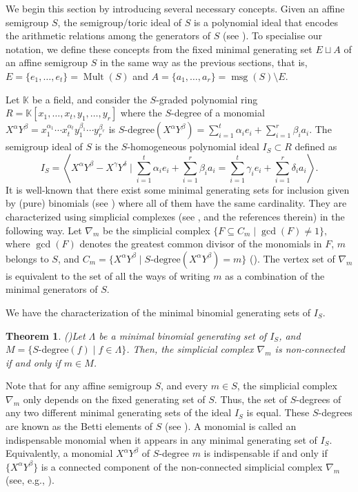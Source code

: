 \documentclass[a4paper,11pt]{article}
\newtheorem{theorem}{Theorem}
\def\k{\mathbb{K}}
\def\msg{\operatorname{msg}}
\def\Mult{\operatorname{Mult}}
\begin{document}
{We begin this section by introducing several necessary concepts. Given an affine semigroup $S$, the semigroup/toric ideal of $S$ is a polynomial ideal that encodes the arithmetic relations among the generators of $S$ (see \cite{Herzog,MillerSturmfels}). To specialise our notation, we define these concepts from the fixed minimal generating set $E\sqcup A$ of an affine semigroup $S$ in the same way as the previous sections, that is, $E=\{e_1,\ldots ,e_t\}=\Mult (S)$ and $A=\{a_1,\ldots ,a_r\}=\msg(S)\setminus E$.

Let $\k$ be a field, and consider the $S$-graded polynomial ring $R=\k[x_1,\ldots,x_t,y_1,\ldots ,y_r]$ where the $S$-degree of a monomial $X^\alpha Y^\beta = x_1^{\alpha_1}\cdots x_t^{\alpha_t}y_1^{\beta_1}\cdots y_r^{\beta_r}$ is $S\text{-degree}(X^\alpha Y^\beta) = \sum _{i=1}^t\alpha_i e_i + \sum _{i=1}^r\beta_i a_i$. The semigroup ideal of $S$ is the $S$-homogeneous polynomial ideal $I_S\subset R$  defined as
\begin{equation}
I_S=\left\langle X^\alpha Y^\beta - X^\gamma Y^\delta \mid \sum _{i=1}^t\alpha_i e_i + \sum _{i=1}^r\beta_i a_i = \sum _{i=1}^t\gamma_i e_i + \sum _{i=1}^r\delta_i a_i\right\rangle.
\end{equation}
It is well-known that there exist some minimal generating sets for inclusion given by (pure) binomials (see \cite{Herzog}) where
all of them have the same cardinality. They are characterized using simplicial complexes (see \cite{ComplejosSimpliciales}, and the references therein) in the following way. Let $\nabla_m$ be the simplicial complex $\big\{ F \subseteq C_m \mid \gcd(F) \neq 1\big\},$ where $\gcd(F)$ denotes the greatest common divisor of the monomials in $F$, $m$ belongs to $S$, and $C_m=\big\{ X^\alpha Y^\beta  \mid S\mbox{-degree}(X^\alpha Y^\beta)=m\big\}$ (\cite{TesisShalom}). The vertex set of $\nabla_m$ is equivalent to the set of all the ways of writing $m$ as a combination of the minimal generators of $S$.

We have the characterization of the minimal binomial generating sets of $I_S$.
\begin{theorem}(\cite{TesisShalom})\label{TheoremShalom}
Let $\Lambda$ be a minimal binomial generating set of $I_S$,
and $M=\{S\text{-degree}(f)\mid f \in \Lambda\}$. Then, the simplicial complex $\nabla_{m}$ is non-connected if and only if $m\in M$.
\end{theorem}

Note that for any affine semigroup $S$, and every $m\in S$, the simplicial complex $\nabla_m$ only depends on the fixed generating set of $S$. Thus, the set of $S$-degrees of any two different minimal generating sets of the ideal $I_S$ is equal. These $S$-degrees are known as the Betti elements of $S$ (see \cite{G-O-10}). A monomial is called an indispensable monomial when it appears in any minimal generating set of $I_S$. Equivalently, a monomial $X^\alpha Y^\beta$ of $S\text{-degree } m$ is indispensable if and only if $\{X^\alpha Y^\beta\}$ is a connected component of the non-connected simplicial complex $\nabla_{m}$ (see, e.g., \cite{CKT}).

}
\end{document}
